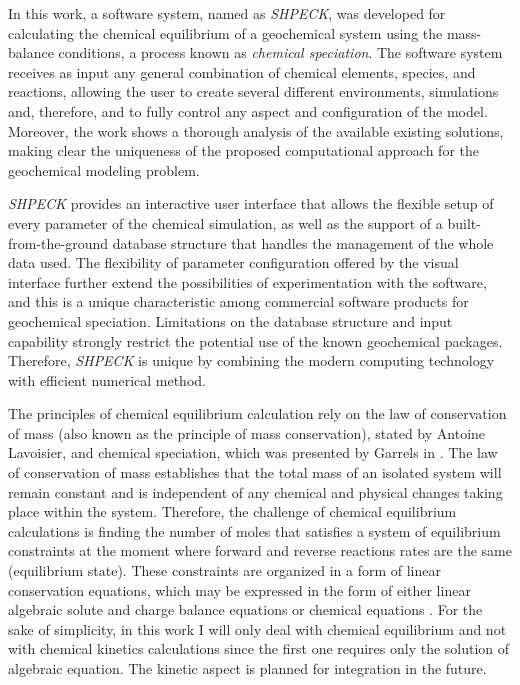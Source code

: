 
In this work, a software system, named as \emph{SHPECK}, was developed for calculating the chemical equilibrium of a geochemical system using the mass-balance conditions, a  process known as \emph{chemical speciation}. The software system receives as input any general combination of chemical elements, species, and reactions, allowing the user to create several different environments, simulations and, therefore, and to fully control any aspect and configuration of the model. Moreover, the work shows a thorough analysis of the available existing solutions, making clear the uniqueness of the proposed computational approach for the geochemical modeling problem.

\emph{SHPECK} provides an interactive user interface that allows the flexible setup of every parameter of the chemical simulation, as well as the support of a built-from-the-ground database structure that handles the management of the whole data used.  The flexibility of parameter configuration offered by the visual interface further extend the possibilities of experimentation with the software, and this is a unique characteristic among commercial software products for geochemical speciation. Limitations on the database structure and input capability strongly restrict the potential use of the known geochemical packages. Therefore, \emph{SHPECK} is unique by combining the modern computing technology with efficient numerical method.


The principles of chemical equilibrium calculation rely on the law of conservation of mass (also known as the principle of mass conservation), stated by Antoine Lavoisier, and chemical speciation, which was presented by Garrels in \cite{Garrels:65}. 
The law of conservation of mass establishes that the total mass of an isolated system will remain constant and is independent of any chemical and physical changes taking place within the system. Therefore, the challenge of chemical equilibrium calculations is finding the number of moles that satisfies a system of equilibrium constraints at the moment where forward and reverse reactions rates are the same (equilibrium state). 
These constraints are organized in a form of linear conservation equations, which may be expressed in the form of either linear algebraic solute and charge balance equations or chemical equations \cite{SmithMissen83}. For the sake of simplicity, in this work I will only deal with chemical equilibrium and not with chemical kinetics calculations since the first one requires only the solution of algebraic equation. The kinetic aspect is planned for integration in the future.

